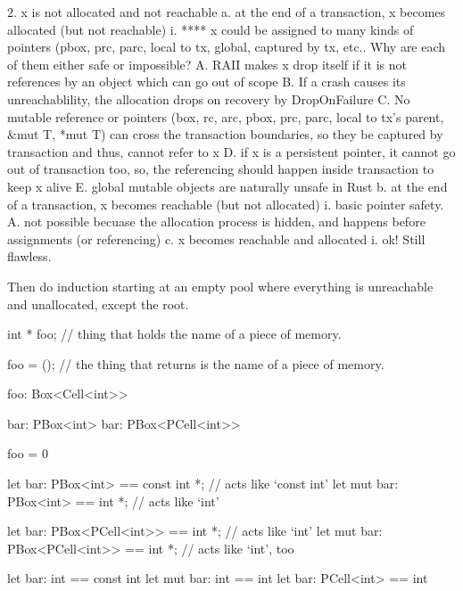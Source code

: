 {2.  x is not allocated and not reachable
    a.  at the end of a transaction, x becomes allocated (but not reachable)
        i.  **** x could be assigned to many kinds of pointers (pbox, prc, parc, local to tx, global, captured by tx, etc..  Why are each of them either safe or impossible?
            A. RAII makes x drop itself if it is not references by an object which can go out of scope
            B. If a crash causes its unreachablility, the allocation drops on recovery by DropOnFailure
            C. No mutable reference or pointers (box, rc, arc, pbox, prc, parc, local to tx's parent, &mut T, *mut T) can cross the transaction boundaries, so they be captured by transaction and thus, cannot refer to x
            D. if x is a persistent pointer, it cannot go out of transaction too, so, the referencing should happen inside transaction to keep x alive
            E. global mutable objects are naturally unsafe in Rust
    b.  at the end of a transaction, x becomes reachable (but not allocated)
        i.  basic pointer safety.
            A. not possible becuase the allocation process is hidden, and happens before assignments (or referencing)
    c.  x becomes reachable and allocated
    	i. ok!  Still flawless.


Then do induction starting at an empty pool where everything is unreachable and unallocated, except the root.


int * foo;  // thing that holds the name of a piece of memory.

foo = \malloc{} (); // the thing that \malloc{} returns is the name of a piece of memory.

foo: Box<Cell<int{>}>


bar: PBox<int>
bar: PBox<PCell<int{>}>

foo = 0

let bar: PBox<int> == const int *; // acts like `const int'
let mut bar: PBox<int> == int *; // acts like `int'

let bar: PBox<PCell<int{>}> == int *; // acts like `int'
let mut bar: PBox<PCell<int{>}> == int *; // acts like `int', too

let bar: int == const int
let mut bar: int == int
let bar: PCell<int> == int
}
